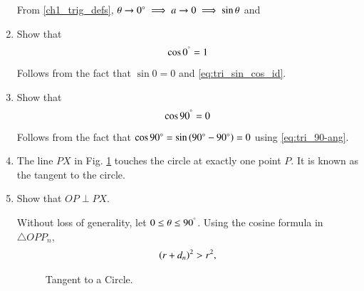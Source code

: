 \begin{enumerate}[label=\arabic*.,ref=\thesubsection.\theenumi]
\solution From \eqref{ch1_trig_defs}, $\theta \to 0\degree \implies a \to 0 \implies \sin \theta $ and %
\item
	Show that 
	\begin{equation}
	\label{ch5_cos_zero}
	\cos 0^{\degree} = 1
	\end{equation}

\solution Follows from the fact that $\sin 0 = 0$ and \eqref{eq:tri_sin_cos_id}.
% 	
\item
	Show that 
	\begin{equation}
	\label{ch5_cos_90}
	\cos 90^{\degree} = 0
	\end{equation}

\solution Follows from the fact that $\cos 90 \degree = \sin \left(90\degree -90\degree\right) = 0$ using \eqref{eq:tri_90-ang}.
\item
	The line $PX$ in Fig. \ref{ch4_tangent_def} touches the circle at exactly one  point $P$. It is known as the tangent to the circle.
%
%
\item
	Show that $OP \perp PX$.

\solution Without loss of generality, let $0 \le \theta \le 90^{\degree}$. Using the cosine formula in $\triangle OPP_n$,\begin{align}
\left(r+d_n\right)^2 > r^2,
\end{align}
%
\begin{figure}[!ht]
	\begin{center}
		
		\resizebox{\columnwidth}{!}{}
	\end{center}
	\caption{Tangent to a Circle.}
	\label{ch4_tangent_def}	
\end{figure}
%
%		


\end{enumerate}
